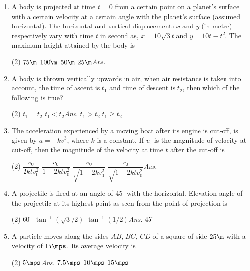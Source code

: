 \documentclass{article}
\newcommand{\ans}{\textcolor{red!95}{\textit{\quad Ans.}}}
\begin{document}
\begin{enumerate}
	\item A body is projected at time $t = 0$ from a certain point on a planet's surface with a certain velocity at a certain angle with the planet's surface (assumed horizontal). The horizontal and vertical displacements $x$ and $y$ (in metre) respectively vary with time $t$ in second as, $x = 10\sqrt{3}t$ and $y = 10t-t^2$. The maximum height attained by the body is
	\begin{tasks}(2)
		\task $75\m$
		\task $100\m$
		\task $50\m$
		\task $25\m$\ans
	\end{tasks}
	
	\item A body is thrown vertically upwards in air, when air resistance is taken into account, the time of ascent is $t_1$ and time of descent is $t_2$, then which of the following is true?
	\begin{tasks}(2)
		\task $t_1=t_2$
		\task $t_1<t_2$\ans
		\task $t_1>t_2$
		\task $t_1\geq t_2$
	\end{tasks}
	
	\item The acceleration experienced by a moving boat after its engine is cut-off, is given by $a = -kv^3$, where $k$ is a constant. If $v_0$ is the magnitude of velocity at cut-off, then the magnitude of the velocity at time $t$ after the cut-off is
	\begin{tasks}(2)
		\task $\dfrac{v_0}{2ktv_0^2}$
		\task $\dfrac{v_0}{1+2ktv_0^2}$
		\task $\dfrac{v_0}{\sqrt{1-2kv_0^2}}$
		\task $\dfrac{v_0}{\sqrt{1+2ktv_0^2}}$\ans
	\end{tasks}
	
	\item A projectile is fired at an angle of $45^\circ$ with the horizontal. Elevation angle of the projectile at its highest point as seen from the point of projection is
	\begin{tasks}(2)
		\task $60^\circ$
		\task $\tan^{-1}(\sqrt{3}/2)$
		\task $\tan^{-1}(1/2)$\ans
		\task $45^\circ$
	\end{tasks}
	
	\item A particle moves along the sides $AB$, $BC$, $CD$ of a square of side $25 \m$ with a velocity of $15 \mps$. Its average velocity is
	\begin{center}
	\end{center}
	\begin{tasks}(2)
		\task $5\mps$\ans
		\task $7.5\mps$
		\task $10\mps$
		\task $15\mps$
	\end{tasks}
	

\end{enumerate}
\end{document}
